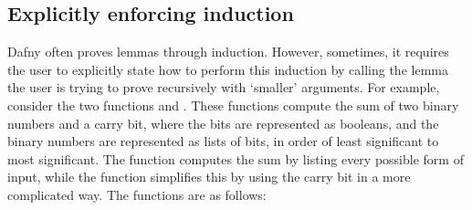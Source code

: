 \subsection{Explicitly enforcing induction}\label{sec:induction}

Dafny often proves lemmas through induction. However, sometimes, it requires the user to explicitly state how to perform this induction by calling the lemma the user is trying to prove recursively with `smaller' arguments. For example, consider the two functions  and . These functions compute the sum of two binary numbers and a carry bit, where the bits are represented as booleans, and the binary numbers are represented as lists of bits, in order of least significant to most significant. The  function computes the sum by listing every possible form of input, while the  function simplifies this by using the carry bit in a more complicated way. The functions are as follows: 

